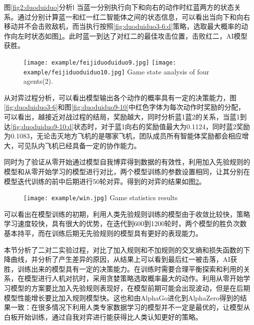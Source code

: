 图\ref{fig2:duoduiduo}分析l 当蓝一分别执行向下和向右的动作时红蓝两方的状态关系。通过分别计算蓝一和红一红二智能体之间的状态信息，可以看出当向下和向右移动并不会击败敌机，而当执行按照\ref{fig:duoduiduo3-6:d}策略，选取最大概率的动作向左时状态如图\ref{fig3:duoduiduo}。此时蓝一到达了对红二的最佳攻击位置，击败红二，AI模型获胜。

\begin{figure}[hpbt]
	\centering
	{\texttt{[image: example/feijiduoduiduo9.jpg]}}
	\hspace{0.5em}
	{\texttt{[image: example/feijiduoduiduo10.jpg]}}
	{Game state analysis of four agents(2).}
	\label{fig3:duoduiduo}
\end{figure}

从对弈过程分析，可以看出模型输出各个动作的概率具有一定的决策能力，图\ref{fig:duoduiduo3-6}和图\ref{fig:duoduiduo9-10}中红色字体为每次动作时奖励的分配，可以看出，越接近对战过程的结局，奖励越大，同时分析蓝1蓝2的关系，当蓝1到达\ref{fig:duoduiduo9-10:d}状态时，对于蓝1向右的奖励值最大为0.1124，同时蓝2奖励为0.1083，无论击灭地方飞机的是哪家飞机，团队成员所有智能体奖励都会相应增大，可见队内飞机已经具备一定的协作能力。

同时为了验证从零开始通过模型自我博弈得到数据的有效性，利用加入先验规则的模型和从零开始学习的模型进行对比，两个模型训练的参数设置相同，让其分别在模型迭代训练的前中后期进行50轮对弈。得到的对弈的结果如图\ref{fig:win}。

\begin{figure}[hbtp]
	\centering
	\texttt{[image: example/win.jpg]}
	{Game statistics results}
	\label{fig:win}
\end{figure}

可以看出在模型训练的初期，利用人类先验规则训练的模型由于收敛比较快，策略学习速度较快，具有很大的优势，在迭代到600到1200轮时，两个模型的胜负次数基本持平，而在训练后期无先验规则的模型具有更好的表现能力。

本节分析了二对二实验过程，对比了加入规则和不加规则的交叉熵和损失函数的下降曲线，并分析了产生差异的原因，从结果上可以看到最后红一被击落，AI获胜，训练出来的模型具有一定的决策能力。在训练时需要合理平衡探索和利用的关系，在模型进行人机对抗时，采用贪婪策略选取概率最大的动作。利用从零开始学习模型的方案要比加入先验规则表现好，在模型前期可能会出现波动，但是在后期模型性能增长要比加入规则模型快。这也和由AlphaGo进化到AlphaZero得到的结果一致：在很多情况下利用人类专家数据学习的模型并不一定是最优的，让模型从白板开始训练，通过自我对弈进行能获得比人类认知更好的策略。

